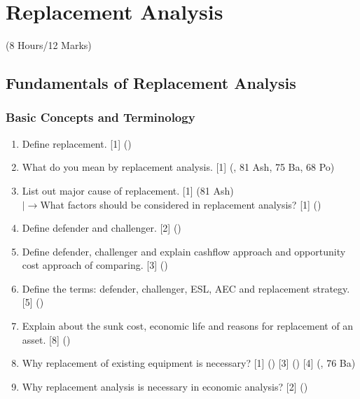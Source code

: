\documentclass[12pt]{article}
\newcommand{\lb}{\\ $\left|\rightarrow\right.$}
\begin{document}
	\pagebreak
\section{Replacement Analysis}
	\begin{center}(8 Hours/12 Marks)\end{center}

	\subsection{Fundamentals of Replacement Analysis}

		\subsubsection{Basic Concepts and Terminology}
			\begin{enumerate}
				\item Define replacement. \hfill [1] ()

				\item What do you mean by replacement analysis. \hfill [1] (, 81 Ash, 75 Ba, 68 Po)

				\item List out major cause of replacement. \hfill [1] (81 Ash)
				\lb What factors should be considered in replacement analysis? \hfill [1] ()

				\item Define defender and challenger. \hfill [2] ()

				\item Define defender, challenger and explain cashflow approach and opportunity cost approach of comparing. \hspace{13.9cm} [3] ()

				\item Define the terms: defender, challenger, ESL, AEC and replacement strategy. \hfill [5] ()

				\item Explain about the sunk cost, economic life and reasons for replacement of an asset. \hfill [8] ()

				\item Why replacement of existing equipment is necessary? \hfill [1] () [3] () [4] (, 76 Ba)

				\item Why replacement analysis is necessary in economic analysis? \hfill [2] ()
			\end{enumerate}
\end{document}
